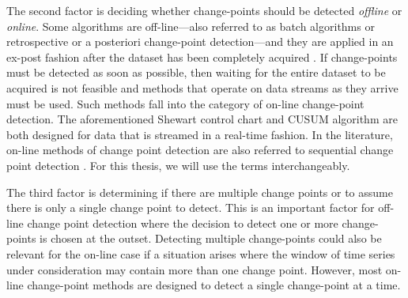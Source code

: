 
The second factor is deciding whether change-points should be detected \textit{offline} or \textit{online}. Some algorithms are off-line---also referred to  as batch algorithms or retrospective or a posteriori change-point detection---and they are applied in an ex-post fashion after the dataset has been completely acquired \cite{truong2018review}. If change-points must be detected as soon as possible, then waiting for the entire dataset to be acquired is not feasible and methods that operate on data streams as they arrive must be used. Such methods fall into the category of on-line change-point detection. The aforementioned Shewart control chart and CUSUM algorithm are both designed for data that is streamed in a real-time fashion. In the literature, on-line methods of change point detection are also referred to sequential change point detection  \cite{tartakovsky2014sequential}. For this thesis, we will use the terms interchangeably.%


The third factor is determining if there are multiple change points or to assume there is only a single change point to detect. This is an important  factor for off-line change point detection where the decision to detect one or more change-points is chosen at the outset.  Detecting multiple change-points could also be relevant for the on-line case if a situation arises where the window of time series under consideration may contain more than one change point. However, most on-line change-point methods are designed to detect a single change-point at a time.

